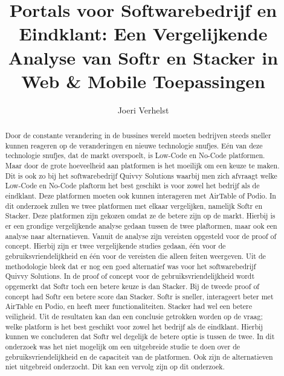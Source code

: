 \documentclass{hogent-article}
\title{Portals voor Softwarebedrijf en Eindklant: Een Vergelijkende Analyse van Softr en Stacker in Web \& Mobile Toepassingen}
\author{Joeri Verhelst}
\begin{document}
\begin{abstract}
  Door de constante verandering in de bussines wereld moeten bedrijven steeds sneller kunnen reageren op de veranderingen en nieuwe technologie snufjes. Eén van deze technologie snufjes, dat de markt overspoelt, is
  Low-Code en No-Code platformen. Maar door de grote hoeveelheid aan platformen is het moeilijk om een keuze te maken. Dit is ook zo bij het softwarebedrijf Quivvy Solutions waarbij men zich afvraagt welke Low-Code en No-Code plaftorm
  het best geschikt is voor zowel het bedrijf als de eindklant. Deze platformen moeten ook kunnen interageren met AirTable of Podio. In dit onderzoek zullen we twee platformen met elkaar vergelijken, namelijk Softr en Stacker. Deze platformen zijn gekozen omdat ze de betere zijn
  op de markt. Hierbij is er een grondige vergelijkende analyse gedaan tussen de twee plaftormen, maar ook een analyse naar alternatieven. Vanuit de analyse zijn vereisten opgesteld voor de proof of concept.
  Hierbij zijn er twee vergelijkende studies gedaan, één voor de gebruiksvriendelijkheid en één voor de vereisten die alleen feiten weergeven. Uit de methodologie bleek dat er nog een goed alternatief was voor het softwarebedrijf Quivvy Solutions. In de proof of concept voor de gebruiksvriendelijkheid
  wordt opgemerkt dat Softr toch een betere keuze is dan Stacker. Bij de tweede proof of concept had Softr een betere score dan Stacker. Softr is sneller, interageert beter met AirTable en Podio, en heeft meer functionaliteiten. Stacker had wel 
  een betere veiligheid. Uit de resultaten kan dan een conclusie getrokken worden op de vraag; welke platform is het best geschikt voor zowel het bedrijf als de eindklant. Hierbij kunnen we concluderen dat Softr wel degelijk de betere optie 
  is tussen de twee. In dit onderzoek was het niet mogelijk om een uitgebreide studie te doen over de gebruiksvriendelijkheid en de capaciteit van de platformen. Ook zijn de alternatieven niet uitgebreid onderzocht. Dit kan een vervolg zijn op dit onderzoek.
\end{abstract}

\tableofcontents



\printbibliography[heading=bibintoc]
\end{document}
